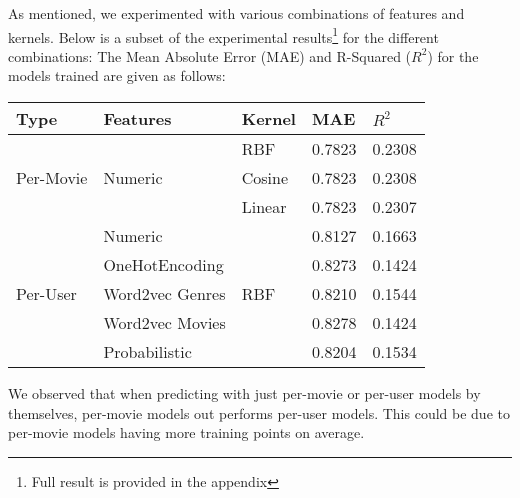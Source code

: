\documentclass[letterpaper]{article}
\begin{document}
As mentioned, we experimented with various combinations of features and kernels. Below is a subset of the experimental results\footnote{Full result is provided in the appendix} for the different combinations:
The Mean Absolute Error (MAE) and R-Squared ($R^{2}$) for the models trained are given as follows:

\begin{center}
	\begin{tabular}{lllll}
		Type & Features & Kernel & MAE & $R^{2}$ \\
		\hline
		\multirow{3}{*}{Per-Movie} &\multirow{3}{*}{Numeric}
		 & RBF & 0.7823 & 0.2308\\
		& & Cosine & 0.7823 & 0.2308 \\
		& & Linear & 0.7823 & 0.2307 \\
		\hline
		\multirow{5}{*}{Per-User} & Numeric & \multirow{5}{*}{RBF} & 0.8127 & 0.1663 \\
		& OneHotEncoding & & 0.8273 & 0.1424 \\
		& Word2vec Genres & & 0.8210 & 0.1544 \\
		& Word2vec Movies & & 0.8278 & 0.1424 \\
		& Probabilistic   & & 0.8204 & 0.1534\\
	\end{tabular}
\end{center}
We observed that when predicting with just per-movie or per-user models by themselves, per-movie models out performs per-user models.
This could be due to per-movie models having more training points on average.
\end{document}

